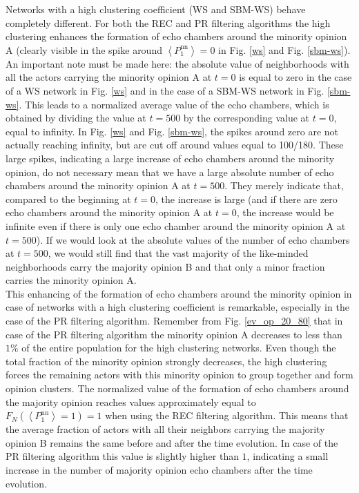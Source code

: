 \documentclass[11 pt , letterpaper , twoside , openright]{book}
\begin{document}
Networks with a high clustering coefficient (WS and SBM-WS) behave completely different. For both the REC and PR filtering algorithms the high clustering enhances the formation of echo chambers around the minority opinion A (clearly visible in the spike around $\left<P_1^{\text{nn}}\right> = 0$ in Fig. \ref{ws} and Fig. \ref{sbm-ws}). An important note must be made here: the absolute value of neighborhoods with all the actors carrying the minority opinion A at $t=0$ is equal to zero in the case of a WS network in Fig. \ref{ws} and in the case of a SBM-WS network in Fig. \ref{sbm-ws}. This leads to a normalized average value of the echo chambers, which is obtained by dividing the value at $t=500$ by the corresponding value at $t=0$, equal to infinity. In Fig. \ref{ws} and Fig. \ref{sbm-ws}, the spikes around zero are not actually reaching infinity, but are cut off around values equal to 100/180. These large spikes, indicating a large increase of echo chambers around the minority opinion, do not necessary mean that we have a large absolute number of echo chambers around the minority opinion A at $t=500$. They merely indicate that, compared to the beginning at $t=0$, the increase is large (and if there are zero echo chambers around the minority opinion A at $t=0$, the increase would be infinite even if there is only one echo chamber around the minority opinion A at $t=500$). If we would look at the absolute values of the number of echo chambers at $t=500$, we would still find that the vast majority of the like-minded neighborhoods carry the majority opinion B and that only a minor fraction carries the minority opinion A.\\
\newline
This enhancing of the formation of echo chambers around the minority opinion in case of networks with a high clustering coefficient is remarkable, especially in the case of the PR filtering algorithm. Remember from Fig. \ref{ev_op_20_80} that in case of the PR filtering algorithm the minority opinion A decreases to less than $1 \%$ of the entire population for the high clustering networks. Even though the total fraction of the minority opinion strongly decreases, the high clustering forces the remaining actors with this minority opinion to group together and form opinion clusters. The normalized value of the formation of echo chambers around the majority opinion reaches values approximately equal to $F_N(\left<P_1^{\text{nn}}\right> = 1) = 1$ when using the REC filtering algorithm. This means that the average fraction of actors with all their neighbors carrying the majority opinion B remains the same before and after the time evolution. In case of the PR filtering algorithm this value is slightly higher than $1$, indicating a small increase in the number of majority opinion echo chambers after the time evolution. 
\end{document}
